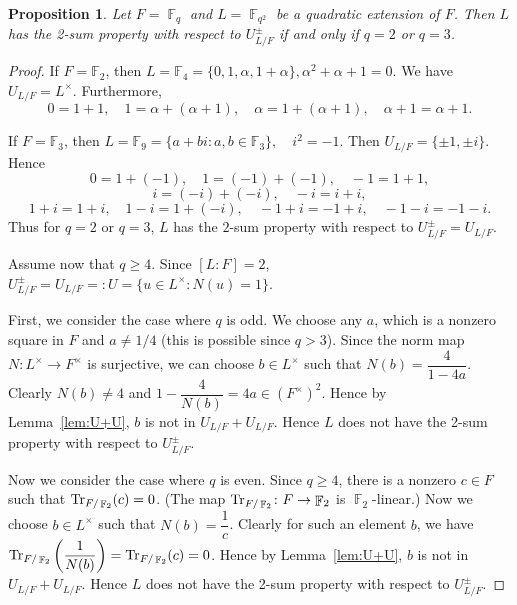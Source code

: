 \documentclass[11pt, a4paper]{amsart}
\newtheorem{prop}[thm]{Proposition}
\theoremstyle{definition}
\DeclareMathOperator{\F}{\mathbb{F}}
\numberwithin{equation}{section}
\begin{document}
\begin{prop}
\label{prop:quadratic 2-sum}
Let $F=\F_q$ and $L=\F_{q^2}$ be a quadratic extension of $F$. Then $L$ has the 2-sum property with respect to $U_{L/F}^{\pm}$ if and only if $q=2$ or $q=3$.
\end{prop}
\begin{proof}
If  \(F=\mathbb{F}_2\), then  \(L=\mathbb{F}_4 =\{0,1,\alpha,1+\alpha\},\alpha^2+\alpha+1=0. \)
We have \( U_{L/F}=L^\times.\)
Furthermore,
\[
0=1+1,\quad
1=\alpha+(\alpha+1),\quad
\alpha=1+(\alpha+1),\quad
\alpha+1=\alpha+1.
\]

If $F=\mathbb{F}_3$, then \(L=\mathbb{F}_9=\{a+bi:a,b\in\mathbb{F}_3\},\quad i^2=-1. \)
Then \(U_{L/F}=\{\pm 1,\pm i\}.\)
Hence
\[
0=1+(-1),\quad
1=(-1)+(-1),\quad
-1=1+1,
\]
\[
i=(-i)+(-i),\quad
-i=i+i,
\]
\[
1+i=1+i,\quad
1-i=1+(-i),\quad
-1+i=-1+i,\quad
-1-i=-1-i.
\]
Thus for $q=2$ or $q=3$, $L$ has the $2$-sum property with respect to $U_{L/F}^{\pm}=U_{L/F}$.

Assume now that $q\geq 4$.  Since $[L:F]=2$, $U_{L/F}^{\pm}=U_{L/F}=:U=\{u\in L^\times: N(u)=1\}$. 
    
  First, we consider the case where $q$ is odd. We choose any $a$, which is a nonzero square in $F$ and $a\not=1/4$ ({this is possible since $q>3$}). Since the norm map $N\colon L^\times \to F^\times$ is surjective, we can choose $b\in L^\times$ such that $N(b)=\dfrac{4}{1-4a}$. Clearly $N(b)\not=4$ and $1-\dfrac{4}{N(b)}=4a\in (F^\times)^2$. Hence by Lemma~\ref{lem:U+U}, $b$ is not in $U_{L/F}+U_{L/F}$. Hence $L$ does not have the 2-sum property with respect to $U_{L/F}^{\pm}$.

    Now we consider the case where $q$ is even. 
    Since $q\geq 4$, there is a nonzero $c\in F$ such that ${\rm Tr}_{F/\F_2}(c)=0$. (The map ${\rm Tr}_{F/\F_2}\colon F\to \F_2$ is  $\F_2$-linear.) Now we choose $b\in L^\times$ such that $N(b)=\dfrac{1}{c}$. Clearly for such an element $b$, we have $ {\rm Tr}_{F/\F_2}\left(\dfrac{1}{N(b)}\right)={\rm Tr}_{F/\F_2}(c)=0$. Hence by Lemma~\ref{lem:U+U}, $b$ is not in $U_{L/F}+U_{L/F}$. Hence $L$ does not have the 2-sum property with respect to $U_{L/F}^{\pm}$.
\end{proof}
\end{document}
